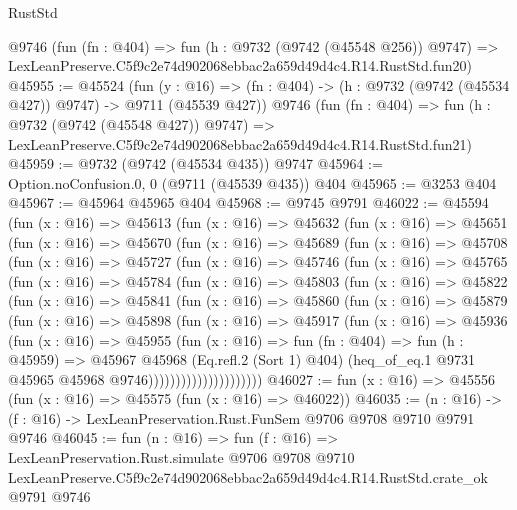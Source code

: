 \begin{lexlean}{RustStd}
\begin{coremodule}
    @9746
    (fun (fn : @404) =>
    fun (h : @9732 (@9742 (@45548 @256)) @9747) =>
    LexLeanPreserve.C5f9c2e74d902068ebbac2a659d49d4c4.R14.RustStd.fun20)
@45955 := @45524
    (fun (y : @16) => (fn : @404) -> (h : @9732 (@9742 (@45534 @427)) @9747) -> @9711 (@45539 @427))
    @9746
    (fun (fn : @404) =>
    fun (h : @9732 (@9742 (@45548 @427)) @9747) =>
    LexLeanPreserve.C5f9c2e74d902068ebbac2a659d49d4c4.R14.RustStd.fun21)
@45959 := @9732 (@9742 (@45534 @435)) @9747
@45964 := Option.noConfusion.{0, 0} (@9711 (@45539 @435)) @404
@45965 := @3253 @404
@45967 := @45964 @45965 @404
@45968 := @9745 @9791
@46022 := @45594
    (fun (x : @16) =>
    @45613
      (fun (x : @16) =>
      @45632
        (fun (x : @16) =>
        @45651
          (fun (x : @16) =>
          @45670
            (fun (x : @16) =>
            @45689
              (fun (x : @16) =>
              @45708
                (fun (x : @16) =>
                @45727
                  (fun (x : @16) =>
                  @45746
                    (fun (x : @16) =>
                    @45765
                      (fun (x : @16) =>
                      @45784
                        (fun (x : @16) =>
                        @45803
                          (fun (x : @16) =>
                          @45822
                            (fun (x : @16) =>
                            @45841
                              (fun (x : @16) =>
                              @45860
                                (fun (x : @16) =>
                                @45879
                                  (fun (x : @16) =>
                                  @45898
                                    (fun (x : @16) =>
                                    @45917
                                      (fun (x : @16) =>
                                      @45936
                                        (fun (x : @16) =>
                                        @45955
                                          (fun (x : @16) =>
                                          fun (fn : @404) =>
                                          fun (h : @45959) =>
                                          @45967
                                            @45968
                                            (Eq.refl.{2} (Sort 1) @404)
                                            (heq_of_eq.{1}
                                              @9731
                                              @45965
                                              @45968
                                              @9746)))))))))))))))))))))
@46027 := fun (x : @16) => @45556 (fun (x : @16) => @45575 (fun (x : @16) => @46022))
@46035 := (n : @16) -> (f : @16) -> LexLeanPreservation.Rust.FunSem @9706 @9708 @9710 @9791 @9746
@46045 := fun (n : @16) =>
  fun (f : @16) =>
  LexLeanPreservation.Rust.simulate
    @9706
    @9708
    @9710
    LexLeanPreserve.C5f9c2e74d902068ebbac2a659d49d4c4.R14.RustStd.crate_ok
    @9791
    @9746
\end{coremodule}
\end{lexlean}

